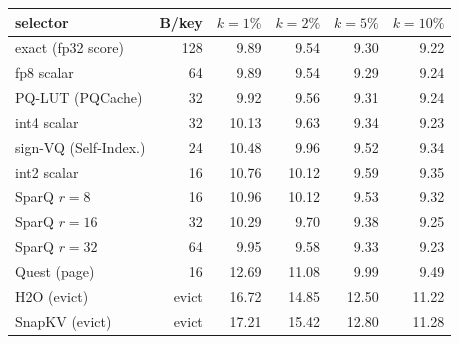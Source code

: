 \begin{tabular}{l r r r r r}
\toprule
selector & B/key & $k{=}1\%$ & $k{=}2\%$ & $k{=}5\%$ & $k{=}10\%$ \\
\midrule
exact (fp32 score) & 128 & 9.89 & 9.54 & 9.30 & 9.22 \\
fp8 scalar & 64 & 9.89 & 9.54 & 9.29 & 9.24 \\
PQ-LUT (PQCache) & 32 & 9.92 & 9.56 & 9.31 & 9.24 \\
int4 scalar & 32 & 10.13 & 9.63 & 9.34 & 9.23 \\
sign-VQ (Self-Index.) & 24 & 10.48 & 9.96 & 9.52 & 9.34 \\
int2 scalar & 16 & 10.76 & 10.12 & 9.59 & 9.35 \\
SparQ $r{=}8$ & 16 & 10.96 & 10.12 & 9.53 & 9.32 \\
SparQ $r{=}16$ & 32 & 10.29 & 9.70 & 9.38 & 9.25 \\
SparQ $r{=}32$ & 64 & 9.95 & 9.58 & 9.33 & 9.23 \\
Quest (page) & 16 & 12.69 & 11.08 & 9.99 & 9.49 \\
H2O (evict) & evict & 16.72 & 14.85 & 12.50 & 11.22 \\
SnapKV (evict) & evict & 17.21 & 15.42 & 12.80 & 11.28 \\
\bottomrule
\end{tabular}
